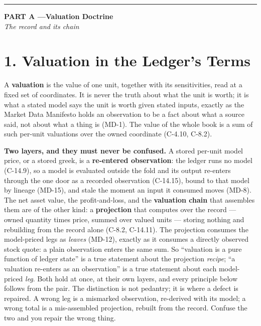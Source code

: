 \documentclass[11pt,a4paper]{article}
\begin{document}
\vspace{0.4em}
\begin{center}\rule{0.35\linewidth}{0.4pt}\end{center}
\vspace{0.6em}

\begin{center}
{\large\bfseries PART A \quad---\quad Valuation Doctrine}\\[0.3em]
{\small\itshape The record and its chain}
\end{center}

\section{1. Valuation in the Ledger's Terms}

A \textbf{valuation} is the value of one unit, together with its
sensitivities, read at a fixed set of coordinates. It is never the truth
about what the unit is worth; it is what a stated model says the unit is
worth given stated inputs, exactly as the Market Data Manifesto holds an
observation to be a fact about what a source said, not about what a thing
is (MD-1). The value of the whole book is a sum of such per-unit
valuations over the owned coordinate (C-4.10, C-8.2).

\textbf{Two layers, and they must never be confused.} A stored per-unit
model price, or a stored greek, is a \textbf{re-entered observation}: the
ledger runs no model (C-14.9), so a model is evaluated outside the fold
and its output re-enters through the one door as a recorded observation
(C-14.15), bound to that model by lineage (MD-15), and stale the moment an
input it consumed moves (MD-8). The net asset value, the profit-and-loss,
and the \textbf{valuation chain} that assembles them are of the other
kind: a \textbf{projection} that computes over the record --- owned
quantity times price, summed over valued units --- storing nothing and
rebuilding from the record alone (C-8.2, C-14.11). The projection consumes
the model-priced legs as \emph{leaves} (MD-12), exactly as it consumes a
directly observed stock quote: a plain observation enters the same sum. So
``valuation is a pure function of ledger state'' is a true statement about
the projection \emph{recipe}; ``a valuation re-enters as an observation''
is a true statement about each model-priced \emph{leg}. Both hold at once,
at their own layers, and every principle below follows from the pair. The
distinction is not pedantry; it is where a defect is repaired. A wrong leg
is a mismarked observation, re-derived with its model; a wrong total is a
mis-assembled projection, rebuilt from the record. Confuse the two and you
repair the wrong thing.
\end{document}
